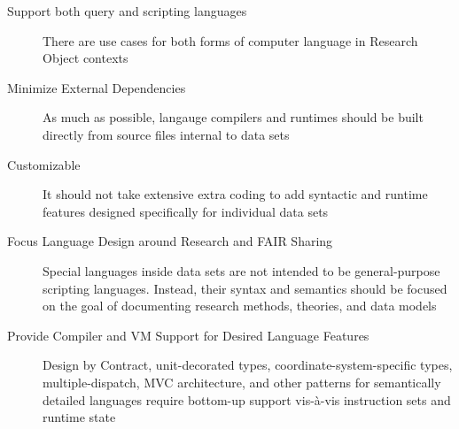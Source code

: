 \begin{frame}{}
\hspace{20pt}\begin{minipage}{.889\textwidth}
{\LARGE {}\selectfont \setlength{\leftmargini}{3pt}\begin{description}
\item[Support both query and scripting languages] {} There are use cases for both 
forms of computer language in Research Object contexts     
\vspace{8pt}
\item[Minimize External Dependencies] {}  As much as possible, langauge 
compilers and runtimes should be built directly from source files internal to data sets  
\vspace{8pt}
\item[Customizable] {} It should not take extensive extra coding to 
add syntactic and runtime features designed specifically for individual data sets  
\vspace{8pt}
\item[Focus Language Design around Research and FAIR Sharing] {}  Special 
languages inside data sets are not intended to be general-purpose scripting 
languages.  Instead, their syntax and semantics should be focused 
on the goal of documenting research methods, theories, and data models
\vspace{8pt}
\item[Provide Compiler and VM Support for Desired Language Features] {}  Design 
by Contract, unit-decorated types, coordinate-system-specific types, 
multiple-dispatch, MVC architecture, and other patterns for semantically 
detailed languages require bottom-up support vis-\`a-vis instruction sets and runtime state
   
\end{description}}\end{minipage}


\end{frame}

